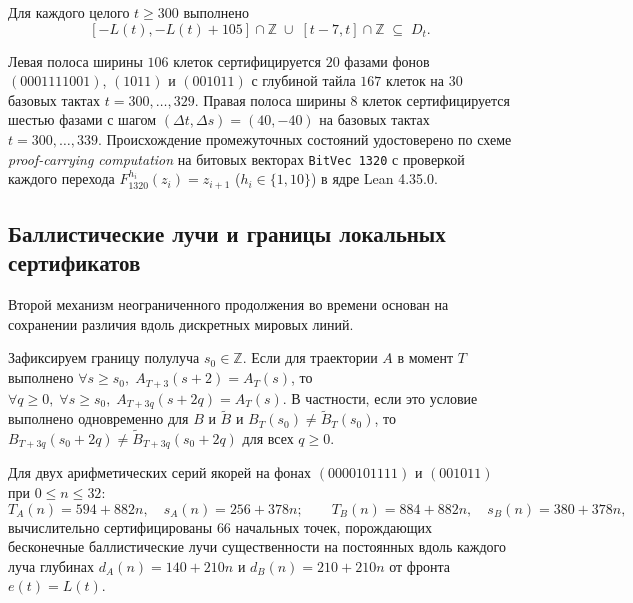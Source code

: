 \begin{theorem}\label{thm:dual_strips}
Для каждого целого $t \ge 300$ выполнено
\begin{equation}\label{eq:dual_strips}
[-L(t), -L(t) + 105] \cap \mathbb{Z} \;\cup\; [t - 7, t] \cap \mathbb{Z} \;\subseteq\; D_t.
\end{equation}
\end{theorem}

Левая полоса ширины $106$ клеток сертифицируется $20$ фазами фонов $(0001111001)$, $(1011)$ и $(001011)$ с глубиной тайла $167$ клеток на $30$ базовых тактах $t = 300, \dots, 329$. Правая полоса ширины $8$ клеток сертифицируется шестью фазами с шагом $(\Delta t, \Delta s) = (40,-40)$ на базовых тактах $t = 300, \dots, 339$. Происхождение промежуточных состояний удостоверено по схеме \emph{proof-carrying computation} на битовых векторах \texttt{BitVec 1320} с проверкой каждого перехода $F_{1320}^{h_i}(z_i) = z_{i+1}$ ($h_i \in \{1, 10\}$) в ядре Lean 4.35.0.

\subsection{Баллистические лучи и границы локальных сертификатов}

Второй механизм неограниченного продолжения во времени основан на сохранении различия вдоль дискретных мировых линий.

\begin{lemma}\label{lem:ballistic_ray}
Зафиксируем границу полулуча $s_0\in\mathbb Z$. Если для траектории $A$ в момент $T$ выполнено $\forall s \ge s_0,\; A_{T+3}(s + 2) = A_T(s)$, то $\forall q \ge 0,\; \forall s \ge s_0,\; A_{T+3q}(s + 2q) = A_T(s)$. В частности, если это условие выполнено одновременно для $B$ и $\widetilde B$ и $B_T(s_0) \ne \widetilde B_T(s_0)$, то $B_{T+3q}(s_0 + 2q) \ne \widetilde B_{T+3q}(s_0 + 2q)$ для всех $q \ge 0$.
\end{lemma}

Для двух арифметических серий якорей на фонах $(0000101111)$ и $(001011)$ при $0 \le n \le 32$:
\begin{equation}
T_A(n) = 594 + 882n,\quad s_A(n) = 256 + 378n; \qquad
T_B(n) = 884 + 882n,\quad s_B(n) = 380 + 378n,
\end{equation}
вычислительно сертифицированы $66$ начальных точек, порождающих бесконечные баллистические лучи существенности на постоянных вдоль каждого луча глубинах $d_A(n) = 140 + 210n$ и $d_B(n) = 210 + 210n$ от фронта $e(t) = L(t)$.


